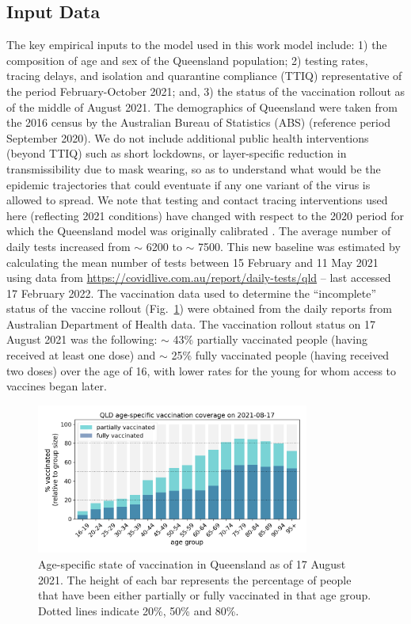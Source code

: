 \documentclass[article, a4, authoryear]{elsarticle}
\begin{document}
\subsection{Input Data}
The key empirical inputs to the model used in this work model include: 1) the composition of age and sex of the Queensland population; 2)  testing rates, tracing delays, and isolation and quarantine compliance (TTIQ) representative of the period February-October 2021; and, 3) the status of the vaccination rollout as of the middle of August 2021. The demographics of Queensland were taken from the 2016 census by the Australian Bureau of Statistics (ABS) (reference period September 2020). We do not include additional public health interventions (beyond TTIQ) such as short lockdowns, or layer-specific reduction in transmissibility due to mask wearing, so as to understand what would be the epidemic trajectories that could eventuate if any one variant of the virus is allowed to spread. We note that testing and contact tracing interventions used here (reflecting 2021 conditions) have changed with respect to the 2020 period for which the Queensland model was originally calibrated \cite{sanz-leon2021qldmodel}. The average number of daily tests increased from $\sim$ 6200 to $\sim$ 7500. This new baseline was estimated by calculating the mean number of tests between 15 February and 11 May 2021 using data from \url{https://covidlive.com.au/report/daily-tests/qld} -- last accessed 17 February 2022. The vaccination data used to determine the  ``incomplete'' status of the vaccine rollout (Fig.~\ref{fig:air_qld_vax_state}) were obtained from the daily reports from Australian Department of Health data. The vaccination rollout status on 17 August 2021 was the following: $\sim$ 43\% partially vaccinated people (having received at least one dose) and $\sim$ 25\% fully vaccinated people (having received two doses) over the age of 16, with lower rates for the young for whom access to vaccines began later. 

\begin{figure}[ht]
    \centering
    \includegraphics[width=0.8\textwidth]{figures/fig02_qld_vax_coverage_status_2021-08-17.png} 
    \caption{Age-specific state of vaccination in Queensland as of 17 August 2021. The height of each bar represents the percentage of people that have been either partially or fully vaccinated in that age group. Dotted lines indicate 20\%, 50\% and 80\%.}
    \label{fig:air_qld_vax_state}
\end{figure}
\end{document}
